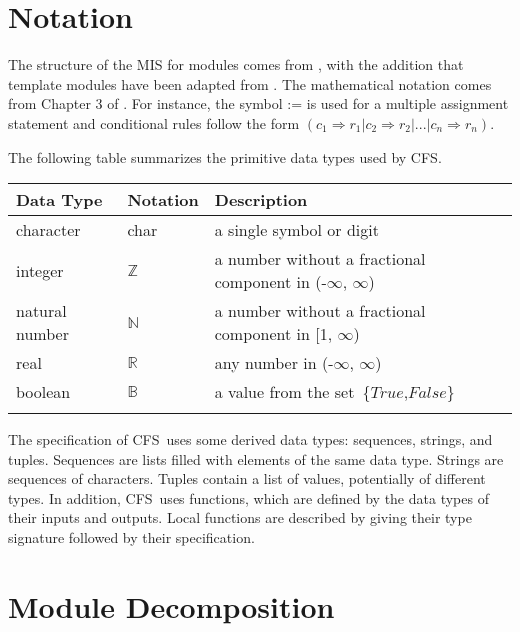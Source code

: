 \documentclass[12pt, titlepage]{article}
\newcommand{\progname}{CFS}
\begin{document}
\section{Notation}

The structure of the MIS for modules comes from \citet{HoffmanAndStrooper1995},
with the addition that template modules have been adapted from
\cite{GhezziEtAl2003}. The mathematical notation comes from Chapter 3 of
\citet{HoffmanAndStrooper1995}.  For instance, the symbol := is used for a
multiple assignment statement and conditional rules follow the form $(c_1
\Longrightarrow r_1 | c_2 \Longrightarrow r_2 | ... | c_n \Longrightarrow r_n 
)$.



The following table summarizes the primitive data types used by \progname. 

\begin{center}
\renewcommand{\arraystretch}{1.2}
\noindent 
\begin{tabular}{l l p{7.5cm}} 
\toprule 
\textbf{Data Type} & \textbf{Notation} & \textbf{Description}\\ 
\midrule
character & char & a single symbol or digit\\
integer & $\mathbb{Z}$ & a number without a fractional component in (-$\infty$, $\infty$) \\
natural number & $\mathbb{N}$ & a number without a fractional component in [1, 
$\infty$) \\
real & $\mathbb{R}$ & any number in (-$\infty$, $\infty$)\\

boolean & $\mathbb{B}$ & a value from the set\ \{$True$,$False$\}\\
\bottomrule
\\
\end{tabular} 
\end{center}

\noindent
The specification of \progname \ uses some derived data types: sequences, strings, and
tuples. Sequences are lists filled with elements of the same data type. Strings
are sequences of characters. Tuples contain a list of values, potentially of
different types. In addition, \progname \ uses functions, which
are defined by the data types of their inputs and outputs. Local functions are
described by giving their type signature followed by their specification.

\section{Module Decomposition}
\end{document}
